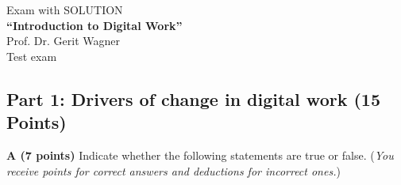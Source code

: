 \documentclass[12pt]{scrartcl}
\begin{document}
\thispagestyle{firststyle}

\begin{center}
\large{Exam with SOLUTION}\\
\vspace{0.5cm}
\large{\textbf{"`Introduction to Digital Work"'}}\\
\vspace{0.5cm}
\large{Prof. Dr. Gerit Wagner}\\
\vspace{0.5cm}
\large{Test exam}\\
\end{center}
\vspace{3cm}



\vfill

\clearpage

\subsection*{Part 1: Drivers of change in digital work (15 Points)}

\textbf{A (7 points)} Indicate whether the following statements are true or false. (\textit{You receive points for correct answers and deductions for incorrect ones.})
\end{document}
